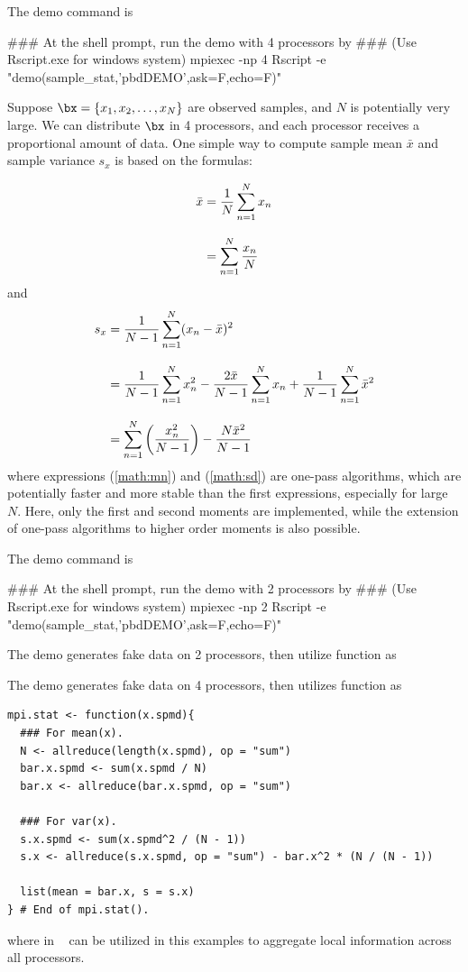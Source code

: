 The demo command is
\begin{Command}
### At the shell prompt, run the demo with 4 processors by
### (Use Rscript.exe for windows system)
mpiexec -np 4 Rscript -e "demo(sample_stat,'pbdDEMO',ask=F,echo=F)"
\end{Command}

Suppose $\bx = \{x_1, x_2, \ldots, x_N\}$
are observed samples, and $N$ is potentially very large.
We can distribute $\bx$ in 4 processors, and each processor receives a proportional amount of data. One simple way to compute sample mean $\bar{x}$ and
sample variance $s_x$ is based on the formulas:

\begin{align}
\bar{x} &= \frac{1}{N} \sum_{n = 1}^N x_n \notag \\[.3cm]
        &= \sum_{n = 1}^N \frac{x_n}{N} \label{math:mn}
\end{align}
and
\begin{align}
s_x     &= \frac{1}{N - 1} \sum_{n = 1}^N (x_n - \bar{x})^2 \notag \\[.3cm]
        &= \frac{1}{N - 1} \sum_{n = 1}^N x_n^2 - \frac{2\bar{x}}{N - 1}\sum_{n = 1}^N x_n +  \frac{1}{N - 1}\sum_{n = 1}^N\bar{x}^2 \notag \\[.3cm]
        &= \sum_{n = 1}^N \left(\frac{x^2_n}{N-1}\right) - \frac{N \bar{x}^2}{N-1} \label{math:sd}
\end{align}
where expressions (\ref{math:mn}) and (\ref{math:sd}) are one-pass algorithms,
which are potentially faster and more stable than the first expressions,
especially for large $N$. Here, only the first and second moments are implemented, while
the extension of one-pass algorithms to higher order moments is also
possible.

The demo command is
\begin{Command}
### At the shell prompt, run the demo with 2 processors by
### (Use Rscript.exe for windows system)
mpiexec -np 2 Rscript -e "demo(sample_stat,'pbdDEMO',ask=F,echo=F)"
\end{Command}

The demo  generates fake data on 2 processors, then
utilize  function as

The demo  generates fake data on 4 processors, then
utilizes  function as
\begin{lstlisting}[language=rr,title=R Code]
mpi.stat <- function(x.spmd){
  ### For mean(x).
  N <- allreduce(length(x.spmd), op = "sum")
  bar.x.spmd <- sum(x.spmd / N)
  bar.x <- allreduce(bar.x.spmd, op = "sum")

  ### For var(x).
  s.x.spmd <- sum(x.spmd^2 / (N - 1))
  s.x <- allreduce(s.x.spmd, op = "sum") - bar.x^2 * (N / (N - 1))

  list(mean = bar.x, s = s.x)
} # End of mpi.stat().
\end{lstlisting}
where  in ~\citep{Chen2012pbdMPIpackage} can
be utilized in this examples to aggregate local information across
all processors.

